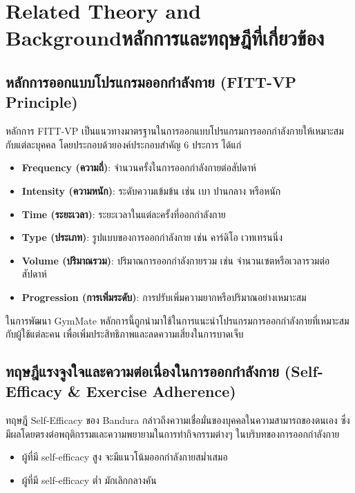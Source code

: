 \chapter{\ifenglish Related Theory and Background\else หลักการและทฤษฎีที่เกี่ยวข้อง\fi}
\label{chap:theory}

\section{หลักการออกแบบโปรแกรมออกกำลังกาย (FITT-VP Principle)}
\label{sec:fitt-vp}

\noindent
หลักการ FITT-VP เป็นแนวทางมาตรฐานในการออกแบบโปรแกรมการออกกำลังกายให้เหมาะสมกับแต่ละบุคคล \cite{acsm2021} โดยประกอบด้วยองค์ประกอบสำคัญ 6 ประการ ได้แก่

\begin{itemize}
  \item \textbf{Frequency (ความถี่)}: จำนวนครั้งในการออกกำลังกายต่อสัปดาห์
  \item \textbf{Intensity (ความหนัก)}: ระดับความเข้มข้น เช่น เบา ปานกลาง หรือหนัก
  \item \textbf{Time (ระยะเวลา)}: ระยะเวลาในแต่ละครั้งที่ออกกำลังกาย
  \item \textbf{Type (ประเภท)}: รูปแบบของการออกกำลังกาย เช่น คาร์ดิโอ เวทเทรนนิ่ง
  \item \textbf{Volume (ปริมาณรวม)}: ปริมาณการออกกำลังกายรวม เช่น จำนวนเซตหรือเวลารวมต่อสัปดาห์
  \item \textbf{Progression (การเพิ่มระดับ)}: การปรับเพิ่มความยากหรือปริมาณอย่างเหมาะสม
\end{itemize}

ในการพัฒนา GymMate หลักการนี้ถูกนำมาใช้ในการแนะนำโปรแกรมการออกกำลังกายที่เหมาะสมกับผู้ใช้แต่ละคน เพื่อเพิ่มประสิทธิภาพและลดความเสี่ยงในการบาดเจ็บ

\section{ทฤษฎีแรงจูงใจและความต่อเนื่องในการออกกำลังกาย (Self-Efficacy \& Exercise Adherence)}
\label{sec:self-efficacy}

\noindent
ทฤษฎี Self-Efficacy ของ Bandura กล่าวถึงความเชื่อมั่นของบุคคลในความสามารถของตนเอง ซึ่งมีผลโดยตรงต่อพฤติกรรมและความพยายามในการทำกิจกรรมต่างๆ \cite{bandura1977} ในบริบทของการออกกำลังกาย

\begin{itemize}
  \item ผู้ที่มี self-efficacy สูง จะมีแนวโน้มออกกำลังกายสม่ำเสมอ
  \item ผู้ที่มี self-efficacy ต่ำ มักเลิกกลางคัน
\end{itemize}

